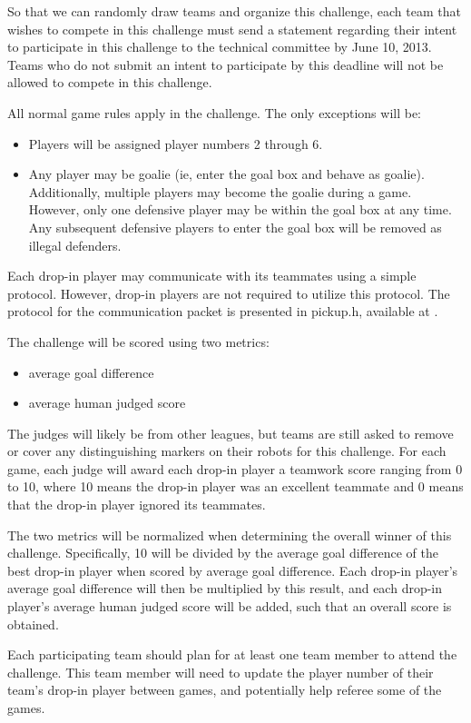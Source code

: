 \documentclass{article}
\begin{document}
So that we can randomly draw teams and organize this challenge, each team that wishes to compete in this challenge must send a statement regarding their intent to participate in this challenge to the technical committee by June 10, 2013.  Teams who do not submit an intent to participate by this deadline will not be allowed to compete in this challenge.

All normal game rules apply in the challenge.  The only exceptions will be:
\begin{itemize}
\item Players will be assigned player numbers 2 through 6.
\item Any player may be goalie (ie, enter the goal box and behave as goalie).  Additionally, multiple players may become the goalie during a game.  However, only one defensive player may be within the goal box at any time.  Any subsequent defensive players to enter the goal box will be removed as illegal defenders.
\end{itemize}

Each drop-in player may communicate with its teammates using a simple protocol.  However, drop-in players are not required to utilize this protocol.  The protocol for the communication packet is presented in pickup.h, available at \url{}.

The challenge will be scored using two metrics: 
\begin{itemize}
\item average goal difference
\item average human judged score
\end{itemize}

The judges will likely be from other leagues, but teams are still asked to remove or cover any distinguishing markers on their robots for this challenge.  For each game, each judge will award each drop-in player a teamwork score ranging from 0 to 10, where 10 means the drop-in player was an excellent teammate and 0 means that the drop-in player ignored its teammates.

The two metrics will be normalized when determining the overall winner of this challenge.  Specifically, 10 will be divided by the average goal difference of the best drop-in player when scored by average goal difference.  Each drop-in player's average goal difference will then be multiplied by this result, and each drop-in player's average human judged score will be added, such that an overall score is obtained.

Each participating team should plan for at least one team member to attend the challenge.  This team member will need to update the player number of their team's drop-in player between games, and potentially help referee some of the games.
\end{document}
